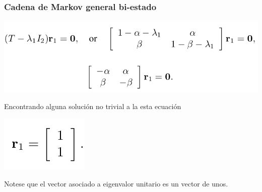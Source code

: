 \documentclass[spanish]{beamer}
\begin{document}
\begin{frame}
\frametitle{Cadena de Markov general bi-estado}

\begin{center}
\includegraphics[scale=0.4]{im5}
\end{center}
Encontrando alguna solución no trivial a la esta ecuación 
\begin{center}
\includegraphics[scale=0.4]{im6}
\end{center}

Notese que el vector asociado a eigenvalor unitario es un vector de unos.
\end{frame}
\end{document}
